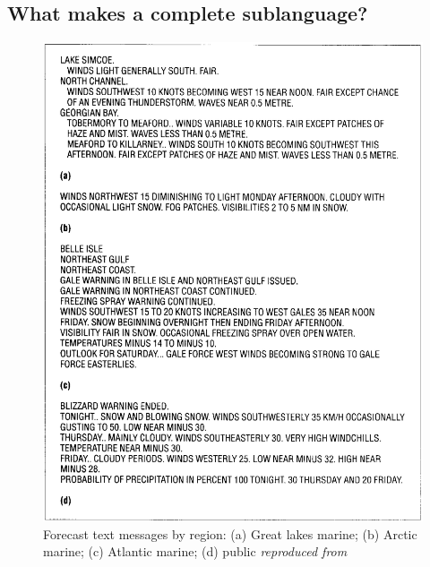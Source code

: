 \subsection{What makes a complete sublanguage?}
\begin{figure}
	\centering
	\includegraphics[scale=0.40] {figures/fog_text_message.png}
	\caption{Forecast text messages by region: (a) Great lakes marine; (b) Arctic marine; (c) Atlantic marine; (d) public \emph{reproduced from \cite{goldbergUsingNaturallanguageProcessing1994}}} \label{fig:fog-text}
\end{figure}

